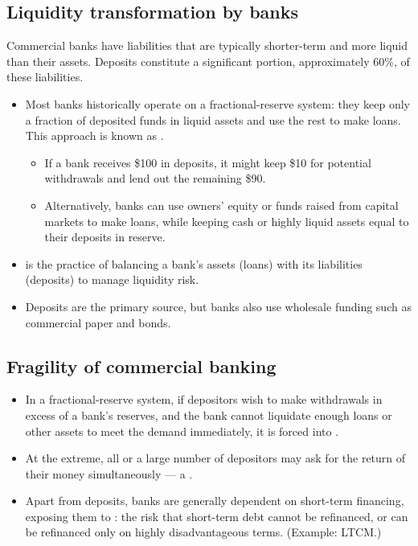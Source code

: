 
\subsection{Liquidity transformation by banks}

Commercial banks have liabilities that are typically shorter-term and more liquid than their assets. Deposits constitute a significant portion, approximately 60\%, of these liabilities.

\begin{itemize}
\item {} Most banks historically operate on a fractional-reserve system: they keep only a fraction of deposited funds in liquid assets and use the rest to make loans. This approach is known as .
  \begin{itemize}
  \item If a bank receives \$100 in deposits, it might keep \$10 for potential withdrawals and lend out the remaining \$90.
  \item Alternatively, banks can use owners' equity or funds raised from capital markets to make loans, while keeping cash or highly liquid assets equal to their deposits in reserve.
  \end{itemize}
\item {} is the practice of balancing a bank's assets (loans) with its liabilities (deposits) to manage liquidity risk.
\item {} Deposits are the primary source, but banks also use wholesale funding such as commercial paper and bonds.
\end{itemize}

\subsection{Fragility of commercial banking}

\begin{itemize}
\item In a fractional-reserve system, if depositors wish to make withdrawals in excess of a bank's reserves, and the bank cannot liquidate enough loans or other assets to meet the demand immediately, it is forced into .
\item At the extreme, all or a large number of depositors may ask for the return of their money simultaneously — a .
\item Apart from deposits, banks are generally dependent on short-term financing, exposing them to : the risk that short-term debt cannot be refinanced, or can be refinanced only on highly disadvantageous terms. (Example: LTCM.)
\end{itemize}

